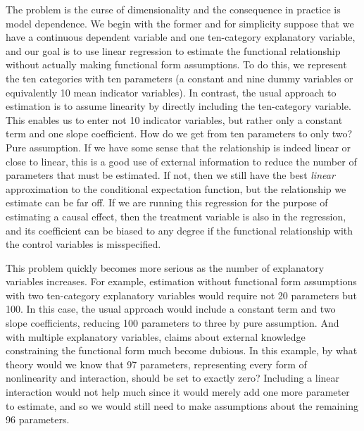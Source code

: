 \documentclass[11pt,titlepage]{article}
\begin{document}
The problem is the curse of dimensionality and the consequence in
practice is model dependence.  We begin with the former and for
simplicity suppose that we have a continuous dependent variable and
one ten-category explanatory variable, and our goal is to use linear
regression to estimate the functional relationship without actually
making functional form assumptions.  To do this, we represent the ten
categories with ten parameters (a constant and nine dummy variables or
equivalently 10 mean indicator variables).  In contrast, the usual
approach to estimation is to assume linearity by directly including
the ten-category variable.  This enables us to enter not 10 indicator
variables, but rather only a constant term and one slope coefficient.
How do we get from ten parameters to only two?  Pure assumption.  If
we have some sense that the relationship is indeed linear or close to
linear, this is a good use of external information to reduce the
number of parameters that must be estimated.  If not, then we still
have the best {\it linear} approximation to the conditional
expectation function, but the relationship we estimate can be far off.
If we are running this regression for the purpose of estimating a
causal effect, then the treatment variable is also in the regression,
and its coefficient can be biased to any degree if the functional
relationship with the control variables is misspecified.

This problem quickly becomes more serious as the number of explanatory
variables increases.  For example, estimation without functional form
assumptions with two ten-category explanatory variables would require
not 20 parameters but 100.  In this case, the usual approach would
include a constant term and two slope coefficients, reducing 100
parameters to three by pure assumption.  And with multiple explanatory
variables, claims about external knowledge constraining the functional
form much become dubious.  In this example, by what theory would we
know that 97 parameters, representing every form of nonlinearity and
interaction, should be set to exactly zero?  Including a linear
interaction would not help much since it would merely add one more
parameter to estimate, and so we would still need to make assumptions
about the remaining 96 parameters.

\end{document}
